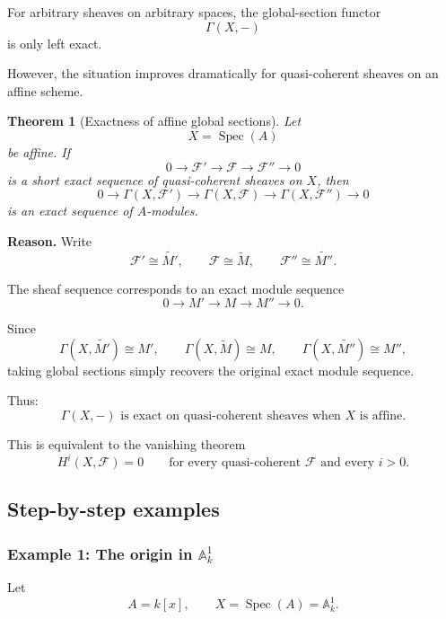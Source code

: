 \documentclass[12pt,a4paper]{article}
\newtheorem{theorem}{Theorem}[section]
\theoremstyle{notespace}
\begin{document}
For arbitrary sheaves on arbitrary spaces, the global-section functor
\[
\Gamma(X,-)
\]
is only left exact.

However, the situation improves dramatically for quasi-coherent sheaves on
an affine scheme.

\begin{theorem}[Exactness of affine global sections]
	Let
	\[
	X=\operatorname{Spec}(A)
	\]
	be affine. If
	\[
	0
	\longrightarrow
	\mathcal{F}'
	\longrightarrow
	\mathcal{F}
	\longrightarrow
	\mathcal{F}''
	\longrightarrow
	0
	\]
	is a short exact sequence of quasi-coherent sheaves on \(X\), then
	\[
	0
	\longrightarrow
	\Gamma(X,\mathcal{F}')
	\longrightarrow
	\Gamma(X,\mathcal{F})
	\longrightarrow
	\Gamma(X,\mathcal{F}'')
	\longrightarrow
	0
	\]
	is an exact sequence of \(A\)-modules.
\end{theorem}

\textbf{Reason.}
Write
\[
\mathcal{F}'\cong\widetilde{M'},
\qquad
\mathcal{F}\cong\widetilde{M},
\qquad
\mathcal{F}''\cong\widetilde{M''}.
\]

The sheaf sequence corresponds to an exact module sequence
\[
0
\longrightarrow
M'
\longrightarrow
M
\longrightarrow
M''
\longrightarrow
0.
\]

Since
\[
\Gamma(X,\widetilde{M'})\cong M',
\qquad
\Gamma(X,\widetilde{M})\cong M,
\qquad
\Gamma(X,\widetilde{M''})\cong M'',
\]
taking global sections simply recovers the original exact module sequence.

Thus:
\[
\boxed{
	\Gamma(X,-)
	\text{ is exact on quasi-coherent sheaves when }X\text{ is affine.}
}
\]

This is equivalent to the vanishing theorem
\[
H^{i}(X,\mathcal{F})=0
\qquad
\text{for every quasi-coherent }\mathcal{F}
\text{ and every }i>0.
\]

\subsection{Step-by-step examples}

\subsubsection{Example 1: The origin in \texorpdfstring{\(\mathbb{A}^{1}_{k}\)}{A1}}

Let
\[
A=k[x],
\qquad
X=\operatorname{Spec}(A)=\mathbb{A}^{1}_{k}.
\]
\end{document}
